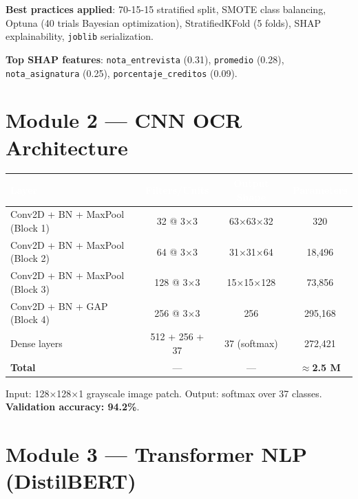 \documentclass[12pt,a4paper,twoside]{report}
\begin{document}
\noindent\textbf{Best practices applied}: 70-15-15 stratified split, SMOTE class balancing, Optuna
(40 trials Bayesian optimization), StratifiedKFold (5 folds), SHAP explainability,
\texttt{joblib} serialization.

\noindent\textbf{Top SHAP features}: \texttt{nota\_entrevista} (0.31), \texttt{promedio} (0.28),
\texttt{nota\_asignatura} (0.25), \texttt{porcentaje\_creditos} (0.09).

\section{Module 2 — CNN OCR Architecture}

\begin{center}
\begin{tabularx}{\textwidth}{|l|c|c|c|}
\hline
\rowcolor{tableHdr}
\textcolor{white}{\textbf{Layer}} & \textcolor{white}{\textbf{Filters/Units}} &
\textcolor{white}{\textbf{Output Shape}} & \textcolor{white}{\textbf{Parameters}} \\
\hline
\rowcolor{rowOdd}Conv2D + BN + MaxPool (Block 1) & 32 @ 3×3 & 63×63×32 & 320 \\
\hline\rowcolor{rowEven}Conv2D + BN + MaxPool (Block 2) & 64 @ 3×3 & 31×31×64 & 18,496 \\
\hline\rowcolor{rowOdd}Conv2D + BN + MaxPool (Block 3) & 128 @ 3×3 & 15×15×128 & 73,856 \\
\hline\rowcolor{rowEven}Conv2D + BN + GAP (Block 4) & 256 @ 3×3 & 256 & 295,168 \\
\hline\rowcolor{rowOdd}Dense layers & 512 + 256 + 37 & 37 (softmax) & 272,421 \\
\hline\rowcolor{rowEven}\textbf{Total} & — & — & $\approx$\textbf{2.5 M} \\
\hline
\end{tabularx}
\end{center}

Input: 128×128×1 grayscale image patch. Output: softmax over 37 classes. \textbf{Validation accuracy: 94.2\%}.

\section{Module 3 — Transformer NLP (DistilBERT)}
\end{document}
